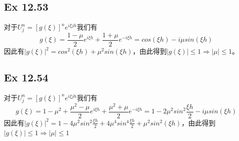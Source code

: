 \documentclass{article}
\begin{document}
\subsection{Ex 12.53}
\par 对于$U^n_j=[g(\xi)]^ne^{i\xi jh}$我们有
$$
g(\xi)=\frac{1-\mu}{2}e^{i\xi h}+\frac{1+\mu}{2}e^{-i\xi h}=cos(\xi h)-i\mu sin(\xi h)
$$
因此有$\vert g(\xi)\vert^2=cos^2(\xi h)+\mu^2sin(\xi h)$，由此得到$\vert g(\xi)\vert \le 1\Rightarrow \vert\mu\vert\le1$。

\subsection{Ex 12.54}
\par 对于$U^n_j=[g(\xi)]^ne^{i\xi jh}$我们有
$$
g(\xi)=1-\mu^2+\frac{\mu^2-\mu}{2}e^{i\xi h}+\frac{\mu^2+\mu}{2}e^{-i\xi h}=1-2\mu^2sin^2\frac{\xi h}{2}-i\mu sin(\xi h)
$$
因此有$\vert g(\xi)\vert^2=1-4\mu^2sin^2\frac{\xi h}{2}+4\mu^4sin^4\frac{\xi h}{2}+\mu^2sin^2(\xi h)$，由此得到$\vert g(\xi)\vert \le 1\Rightarrow \vert \mu \vert \le1$
\end{document}
